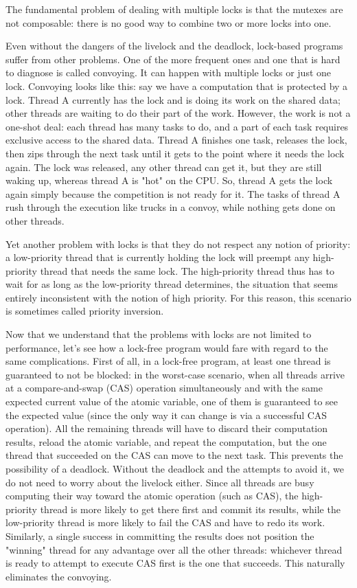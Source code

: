 The fundamental problem of dealing with multiple locks is that the mutexes are not composable: there is no good way to combine two or more locks into one.

Even without the dangers of the livelock and the deadlock, lock-based programs suffer from other problems. One of the more frequent ones and one that is hard to diagnose is called convoying. It can happen with multiple locks or just one lock. Convoying looks like this: say we have a computation that is protected by a lock. Thread A currently has the lock and is doing its work on the shared data; other threads are waiting to do their part of the work. However, the work is not a one-shot deal: each thread has many tasks to do, and a part of each task requires exclusive access to the shared data. Thread A finishes one task, releases the lock, then zips through the next task until it gets to the point where it needs the lock again. The lock was released, any other thread can get it, but they are still waking up, whereas thread A is "hot" on the CPU. So, thread A gets the lock again simply because the competition is not ready for it. The tasks of thread A rush through the execution like trucks in a convoy, while nothing gets done on other threads. 

Yet another problem with locks is that they do not respect any notion of priority: a low-priority thread that is currently holding the lock will preempt any high-priority thread that needs the same lock. The high-priority thread thus has to wait for as long as the low-priority thread determines, the situation that seems entirely inconsistent with the notion of high priority. For this reason, this scenario is sometimes called priority inversion.

Now that we understand that the problems with locks are not limited to performance, let's see how a lock-free program would fare with regard to the same complications. First of all, in a lock-free program, at least one thread is guaranteed to not be blocked: in the worst-case scenario, when all threads arrive at a compare-and-swap (CAS) operation simultaneously and with the same expected current value of the atomic variable, one of them is guaranteed to see the expected value (since the only way it can change is via a successful CAS operation). All the remaining threads will have to discard their computation results, reload the atomic variable, and repeat the computation, but the one thread that succeeded on the CAS can move to the next task. This prevents the possibility of a deadlock. Without the deadlock and the attempts to avoid it, we do not need to worry about the livelock either. Since all threads are busy computing their way toward the atomic operation (such as CAS), the high-priority thread is more likely to get there first and commit its results, while the low-priority thread is more likely to fail the CAS and have to redo its work. Similarly, a single success in committing the results does not position the "winning" thread for any advantage over all the other threads: whichever thread is ready to attempt to execute CAS first is the one that succeeds. This naturally eliminates the convoying.

